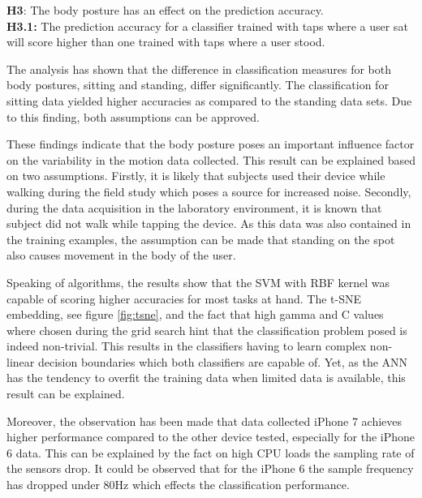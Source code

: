 

\begin{center}
  \begin{framed}
    \textbf{H3}: The body posture has an effect on the prediction accuracy.\\
    \textbf{H3.1:} The prediction accuracy for a classifier trained with taps where a user sat will score higher than one trained with taps where a user stood.
  \end{framed}
\end{center}

The analysis has shown that the difference in classification measures for both body postures, sitting and standing, differ significantly. The classification for sitting data yielded higher accuracies as compared to the standing data sets. Due to this finding, both assumptions can be approved. 

These findings indicate that the body posture poses an important influence factor on the variability in the motion data collected. This result can be explained based on two assumptions. Firstly, it is likely that subjects used their device while walking during the field study which poses a source for increased noise. Secondly, during the data acquisition in the laboratory environment, it is known that subject did not walk while tapping the device. As this data was also contained in the training examples, the assumption can be made that standing on the spot also causes movement in the body of the user.

Speaking of algorithms, the results show that the SVM with RBF kernel was capable of scoring higher accuracies for most tasks at hand. The t-SNE embedding, see figure \ref{fig:tsne}, and the fact that high gamma and C values where chosen during the grid search hint that the classification problem posed is indeed non-trivial. This results in the classifiers having to learn complex non-linear decision boundaries which both classifiers are capable of. Yet, as the ANN has the tendency to overfit the training data when limited data is available, this result can be explained.

Moreover, the observation has been made that data collected iPhone 7 achieves higher performance compared to the other device tested, especially for the iPhone 6 data. This can be explained by the fact on high CPU loads the sampling rate of the sensors drop. It could be observed that for the iPhone 6 the sample frequency has dropped under 80Hz which effects the classification performance.


